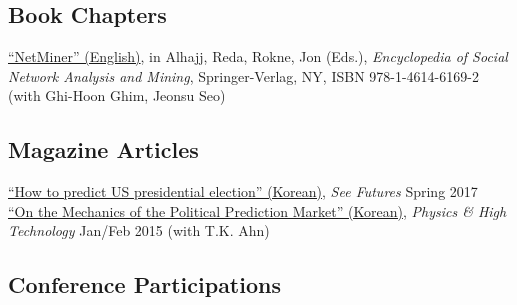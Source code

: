 \documentclass[11pt, a4paper]{article} %
\newcommand{\years}[1]{\marginnote{\scriptsize #1}} %
\begin{document}


\subsection*{Book Chapters}

\years{2014} \href{http://www.springer.com/us/book/9781461461692}{``NetMiner'' (English)}, in Alhajj, Reda, Rokne, Jon (Eds.), \textit{Encyclopedia of Social Network Analysis and Mining}, Springer-Verlag, NY, ISBN 978-1-4614-6169-2 (with Ghi-Hoon Ghim, Jeonsu Seo)\\


\subsection*{Magazine Articles}

\years{2017}
\href{http://futures.kaist.ac.kr/center05/periodical/view/tableid/periodical/id/384}{``How to predict US presidential election'' (Korean)}, \emph{See Futures} Spring 2017\\
\years{2015} \href{http://webzine.kps.or.kr/?now_url=../contents/data/webzine/webzine/14762088365.pdf}{``On the Mechanics of the Political Prediction Market'' (Korean)}, \emph{Physics \& High Technology} Jan/Feb 2015 (with T.K. Ahn)\\

\subsection*{Conference Participations}
\end{document}
